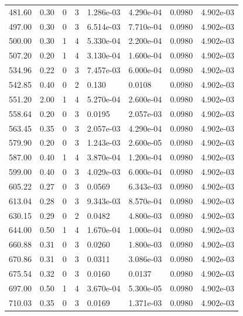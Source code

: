 \documentclass[preview]{standalone}
\begin{document}
{{{\begin{tabular}{L{1.2cm}C{1.2cm} C{0.3cm}C{0.5cm} C{1.4cm}C{1.4cm} C{1.4cm}C{1.4cm}}
  481.60  &  0.30  & 0     &  3 &  1.286e-03  & 4.290e-04  & 0.0980 &  4.902e-03   \\ 
  497.00  &  0.30  & 0     &  3 &  6.514e-03  & 7.710e-04  & 0.0980 &  4.902e-03   \\ 
  500.00  &  0.30  & 1     &  4 &  5.330e-04  & 2.200e-04  & 0.0980 &  4.902e-03   \\ 
  507.20  &  0.20  & 1     &  4 &  3.130e-04  & 1.600e-04  & 0.0980 &  4.902e-03   \\ 
  534.96  &  0.22  & 0     &  3 &  7.457e-03  & 6.000e-04  & 0.0980 &  4.902e-03   \\ 
  542.85  &  0.40  & 0     &  2 &  0.130  & 0.0108  & 0.0980 &  4.902e-03   \\ 
  551.20  &  2.00  & 1     &  4 &  5.270e-04  & 2.600e-04  & 0.0980 &  4.902e-03   \\ 
  558.64  &  0.20  & 0     &  3 &  0.0195  & 2.057e-03  & 0.0980 &  4.902e-03   \\ 
  563.45  &  0.35  & 0     &  3 &  2.057e-03  & 4.290e-04  & 0.0980 &  4.902e-03   \\ 
  579.90  &  0.20  & 0     &  3 &  1.243e-03  & 2.600e-05  & 0.0980 &  4.902e-03   \\ 
  587.00  &  0.40  & 1     &  4 &  3.870e-04  & 1.200e-04  & 0.0980 &  4.902e-03   \\ 
  599.00  &  0.40  & 0     &  3 &  4.029e-03  & 6.000e-04  & 0.0980 &  4.902e-03   \\ 
  605.22  &  0.27  & 0     &  3 &  0.0569  & 6.343e-03  & 0.0980 &  4.902e-03   \\ 
  613.04  &  0.28  & 0     &  3 &  9.343e-03  & 8.570e-04  & 0.0980 &  4.902e-03   \\ 
  630.15  &  0.29  & 0     &  2 &  0.0482  & 4.800e-03  & 0.0980 &  4.902e-03   \\ 
  644.00  &  0.50  & 1     &  4 &  1.670e-04  & 1.000e-04  & 0.0980 &  4.902e-03   \\ 
  660.88  &  0.31  & 0     &  3 &  0.0260  & 1.800e-03  & 0.0980 &  4.902e-03   \\ 
  670.86  &  0.31  & 0     &  3 &  0.0311  & 3.086e-03  & 0.0980 &  4.902e-03   \\ 
  675.54  &  0.32  & 0     &  3 &  0.0160  & 0.0137  & 0.0980 &  4.902e-03   \\ 
  697.00  &  0.50  & 1     &  4 &  3.670e-04  & 5.300e-05  & 0.0980 &  4.902e-03   \\ 
  710.03  &  0.35  & 0     &  3 &  0.0169  & 1.371e-03  & 0.0980 &  4.902e-03   \\ 

\end{tabular}}}}
\end{document}
